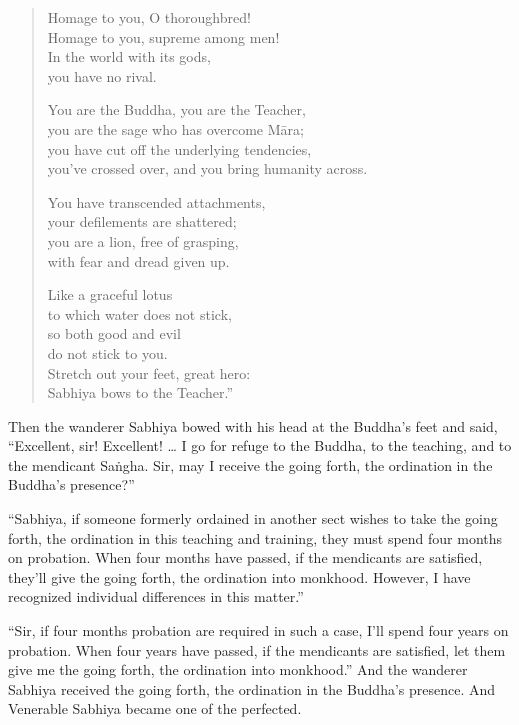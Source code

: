 \documentclass[12pt,openany]{book}%
\begin{document}
\begin{verse}
Homage to you, O thoroughbred! \\
Homage to you, supreme among men! \\
In the world with its gods, \\
you have no rival. 

You are the Buddha, you are the Teacher, \\
you are the sage who has overcome \textsanskrit{Māra}; \\
you have cut off the underlying tendencies, \\
you’ve crossed over, and you bring humanity across. 

You have transcended attachments, \\
your defilements are shattered; \\
you are a lion, free of grasping, \\
with fear and dread given up. 

Like a graceful lotus \\
to which water does not stick, \\
so both good and evil \\
do not stick to you. \\
Stretch out your feet, great hero: \\
Sabhiya bows to the Teacher.” 

%
\end{verse}

Then the wanderer Sabhiya bowed with his head at the Buddha’s feet and said, “Excellent, sir! Excellent! … I go for refuge to the Buddha, to the teaching, and to the mendicant \textsanskrit{Saṅgha}. Sir, may I receive the going forth, the ordination in the Buddha’s presence?” 

“Sabhiya, if someone formerly ordained in another sect wishes to take the going forth, the ordination in this teaching and training, they must spend four months on probation. When four months have passed, if the mendicants are satisfied, they’ll give the going forth, the ordination into monkhood. However, I have recognized individual differences in this matter.” 

“Sir, if four months probation are required in such a case, I’ll spend four years on probation. When four years have passed, if the mendicants are satisfied, let them give me the going forth, the ordination into monkhood.” And the wanderer Sabhiya received the going forth, the ordination in the Buddha’s presence. And Venerable Sabhiya became one of the perfected. 
\end{document}
